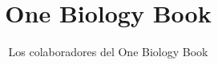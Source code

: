 \documentclass[11pt,a4paper,twoside,openany]{book}
\title{One Biology Book}
\author{Los colaboradores del One Biology Book}
\date{\bookdate}
\begin{document}
\frontmatter




\tableofcontents

\mainmatter





\appendix
\part{\omsolutionspart}




\backmatter
\renewcommand{\indexspace}{\par\vskip 8pt plus 4pt minus 4pt\relax}
\printindex
\end{document}
